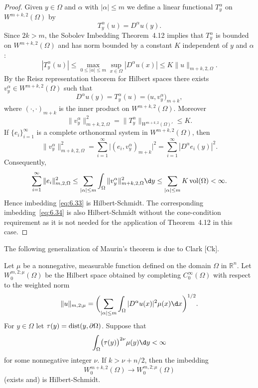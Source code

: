 \begin{proof}
  Given $y\in\Omega$ and $\alpha$ with $|\alpha|\leq m$ we define a linear
  functional $T_y^\alpha$ on $W^{m+k,2}(\Omega)$ by
  \[ T_y^\alpha(u) = D^\alpha u(y). \]
  Since $2k>m$, the Sobolev Imbedding Theorem~4.12 implies that $T_y^\alpha$
  is bounded on $W^{m+k,2}(\Omega)$ and has norm bounded by a constant $K$
  independent of $y$ and $\alpha$:
  \[ |T_y^\alpha(u)| \leq \max_{0\leq|\alpha|\leq m} \sup_{x\in\Omega}
      |D^\alpha u(x)| \leq K\|u\|_{m+k,2,\Omega}. \]
  By the Reisz representation theorem for Hilbert spaces there
  exists $v_y^\alpha\in W^{m+k,2}(\Omega)$ such that
  \[ D^\alpha u(y) = T_y^\alpha(u) = \bigl(u, v_y^\alpha\bigr)_{m+k}, \]
  where $(\cdot,\cdot)_{m+k}$ is the inner product on $W^{m+k,2}(\Omega)$.
  Moreover
  \[ \|v_y^\alpha\|_{m+k,2,\Omega}^2 = \|T_y^\alpha\|_{W^{m+k,2}(\Omega)'} \leq K. \]
  If $\{e_i\}_{i=1}^\infty$ is a complete orthonormal system in $W^{m+k,2}(\Omega)$, then
  \[ \|v_y^\alpha\|_{m+k,2,\Omega}^2
      = \sum_{i=1}^\infty \bigl|(e_i, v_y^\alpha)_{m+k}\bigr|^2
      = \sum_{i=1}^\infty |D^\alpha e_i(y)|^2. \]
  Consequently,
  \[ \sum_{i=1}^\infty \|e_i\|_{m,2,\Omega}^2
      \leq \sum_{|\alpha|\leq m} \int_{\Omega} \|v_y^\alpha\|_{m+k,2,\Omega}^2 \d y
      \leq \sum_{|\alpha|\leq m} K \vol(\Omega) < \infty. \]
  Hence imbedding \eqref{eq:6.33} is Hilbert-Schmidt. The corresponding
  imbedding~\eqref{eq:6.34} is also Hilbert-Schmidt without the cone-condition
  requirement as it is not needed for the application of Theorem~4.12 in this case.
\end{proof}

The following generalization of Maurin's theorem is due to Clark [Ck].

\begin{theorem}
  Let $\mu$ be a nonnegative, measurable function defined on the domain $\Omega$
  in $\mathbb{R}^n$. Let $W_0^{m,2;\mu}(\Omega)$ be the Hilbert space obtained
  by completing $C_0^\infty(\Omega)$ with respect to the weighted norm
  \[ \|u\|_{m,2;\mu} = \biggl(\sum_{|\alpha|\leq m} \int_{\Omega} 
      |D^\alpha u(x)|^2 \mu(x) \d x\biggr)^{1/2}. \]
  For $y\in\Omega$ let $\tau(y) = \operatorname{dist}(y,\partial\Omega)$. Suppose that
  \begin{equation}\label{eq:6.35}
    \int_{\Omega} \bigl(\tau(y)\bigr)^{2\nu} \mu(y) \d y < \infty
  \end{equation}
  for some nonnegative integer $\nu$. If $k>\nu+n/2$, then the imbedding
  \begin{equation}\label{eq:6.36}
    W_0^{m+k,2}(\Omega) \to W_0^{m,2;\mu}(\Omega)
  \end{equation}
  (exists and) is Hilbert-Schmidt.
\end{theorem}

